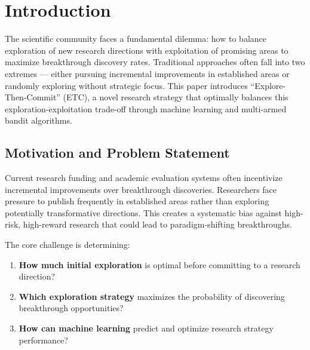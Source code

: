 \documentclass[letterpaper]{article} %
\begin{document}

\section{Introduction}

The scientific community faces a fundamental dilemma: how to balance exploration of new research directions with exploitation of promising areas to maximize breakthrough discovery rates. Traditional approaches often fall into two extremes --- either pursuing incremental improvements in established areas or randomly exploring without strategic focus. This paper introduces ``Explore-Then-Commit'' (ETC), a novel research strategy that optimally balances this exploration-exploitation trade-off through machine learning and multi-armed bandit algorithms.

\subsection{Motivation and Problem Statement}

Current research funding and academic evaluation systems often incentivize incremental improvements over breakthrough discoveries. Researchers face pressure to publish frequently in established areas rather than exploring potentially transformative directions. This creates a systematic bias against high-risk, high-reward research that could lead to paradigm-shifting breakthroughs.

The core challenge is determining:
\begin{enumerate}
\item \textbf{How much initial exploration} is optimal before committing to a research direction?
\item \textbf{Which exploration strategy} maximizes the probability of discovering breakthrough opportunities?
\item \textbf{How can machine learning} predict and optimize research strategy performance?
\end{enumerate}
\end{document}
